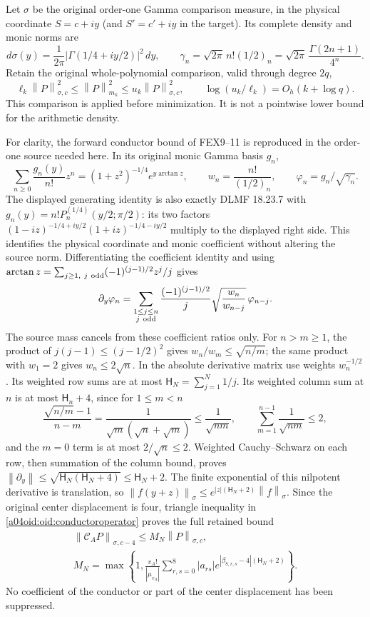 \documentclass[11pt,a4paper]{article}
\providecommand{\norm}[1]{\left\lVert#1\right\rVert}
\begin{document}
Let $\sigma$ be the original order-one Gamma comparison measure,
in the physical coordinate $S=c+iy$ (and $S'=c'+iy$ in the target).
Its complete density and monic norms are
\[
 d\sigma(y)=\frac1{2\pi}|\Gamma(1/4+iy/2)|^2\,dy,\qquad
 \gamma_n=\sqrt{2\pi}\,n!(1/2)_n
 =\sqrt{2\pi}\,\frac{\Gamma(2n+1)}{4^n}.
\]
Retain the original whole-polynomial comparison, valid through degree
$2q$,
\begin{equation}\label{a04oid:oid:comparison}
 \ell_k\norm P_{\sigma,c}^2\le\norm P_{m_k}^2
 \le u_k\norm P_{\sigma,c}^2,
 \qquad \log(u_k/\ell_k)=O_h(k+\log q).
\end{equation}
This comparison is applied before minimization. It is not a
pointwise lower bound for the arithmetic density.

For clarity, the forward conductor bound of FEX9--11 is reproduced
in the order-one source needed here. In its original monic Gamma
basis $g_n$,
\[
 \sum_{n\ge0}\frac{g_n(y)}{n!}z^n
 =(1+z^2)^{-1/4}e^{y\arctan z},\qquad
 w_n=\frac{n!}{(1/2)_n},\qquad \varphi_n=g_n/\sqrt{\gamma_n}.
\]
The displayed generating identity is also exactly DLMF 18.23.7
\cite{a04oid:DLMF18} with
$g_n(y)=n!P_n^{(1/4)}(y/2;\pi/2)$: its two factors
$(1-iz)^{-1/4+iy/2}(1+iz)^{-1/4-iy/2}$ multiply to the displayed
right side. This identifies the physical coordinate and monic
coefficient without altering the source norm.
Differentiating the coefficient identity and using
$\arctan z=\sum_{j\ge1,\ j\ {\rm odd}}(-1)^{(j-1)/2}z^j/j$
gives
\[
 \partial_y\varphi_n=
 \sum_{\substack{1\le j\le n\\j\ {\rm odd}}}
 \frac{(-1)^{(j-1)/2}}{j}\sqrt{\frac{w_n}{w_{n-j}}}\,
 \varphi_{n-j}.
\]
The source mass cancels from these coefficient ratios only.
For $n>m\ge1$, the product of
$j(j-1)\le(j-1/2)^2$ gives $w_n/w_m\le\sqrt{n/m}$;
the same product with $w_1=2$ gives $w_n\le2\sqrt n$.
In the absolute derivative matrix use weights $w_n^{-1/2}$.
Its weighted row sums are at most
$\mathsf H_N=\sum_{j=1}^N1/j$. Its weighted column sum at $n$ is
at most $\mathsf H_n+4$, since for $1\le m<n$
\[
 \frac{\sqrt{n/m}-1}{n-m}
 =\frac1{\sqrt m(\sqrt n+\sqrt m)}\le\frac1{\sqrt{nm}},
 \qquad \sum_{m=1}^{n-1}\frac1{\sqrt{nm}}\le2,
\]
and the $m=0$ term is at most $2/\sqrt n\le2$.
Weighted Cauchy--Schwarz on each row, then summation of the column
bound, proves
$\norm{\partial_y}\le\sqrt{\mathsf H_N(\mathsf H_N+4)}
\le\mathsf H_N+2$. The finite exponential of this nilpotent
derivative is translation, so
$\norm{f(y+z)}_\sigma\le e^{|z|(\mathsf H_N+2)}\norm f_\sigma$.
Since the original center displacement is four, triangle inequality
in \eqref{a04oid:oid:conductoroperator} proves the full retained bound
\begin{equation}\label{a04oid:oid:forward}
 \begin{gathered}
 \norm{\mathcal C_AP}_{\sigma,c-4}\le M_N\norm P_{\sigma,c},\\
 M_N=\max\left\{1,\frac{v_A!}{|\mu_{v_A}|}
 \sum_{r,s=0}^8|a_{rs}|
 e^{|\beta_{8,r,s}-4|(\mathsf H_N+2)}\right\}.
 \end{gathered}
\end{equation}
No coefficient of the conductor or part of the center displacement
has been suppressed.
\end{document}
